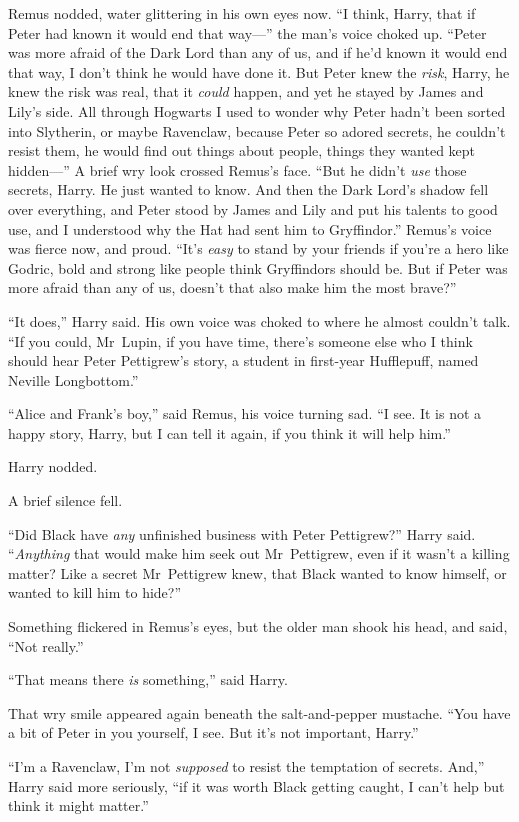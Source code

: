 Remus nodded, water glittering in his own eyes now. “I think, Harry, that if
Peter had known it would end that way—” the man’s voice choked up. “Peter was
more afraid of the Dark Lord than any of us, and if he’d known it would end
that way, I don’t think he would have done it. But Peter knew the \emph{risk},
Harry, he knew the risk was real, that it \emph{could} happen, and yet he
stayed by James and Lily’s side. All through Hogwarts I used to wonder why
Peter hadn’t been sorted into Slytherin, or maybe Ravenclaw, because Peter so
adored secrets, he couldn’t resist them, he would find out things about people,
things they wanted kept hidden—” A brief wry look crossed Remus’s face. “But
he didn’t \emph{use} those secrets, Harry. He just wanted to know. And then the
Dark Lord’s shadow fell over everything, and Peter stood by James and Lily and
put his talents to good use, and I understood why the Hat had sent him to
Gryffindor.” Remus’s voice was fierce now, and proud. “It’s \emph{easy} to
stand by your friends if you’re a hero like Godric, bold and strong like people
think Gryffindors should be. But if Peter was more afraid than any of us,
doesn’t that also make him the most brave?”

“It does,” Harry said. His own voice was choked to where he almost couldn’t
talk. “If you could, Mr~Lupin, if you have time, there’s someone else who I
think should hear Peter Pettigrew’s story, a student in first-year Hufflepuff,
named Neville Longbottom.”

“Alice and Frank’s boy,” said Remus, his voice turning sad. “I see. It is not a
happy story, Harry, but I can tell it again, if you think it will help him.”

Harry nodded.

A brief silence fell.

“Did Black have \emph{any} unfinished business with Peter Pettigrew?” Harry
said. “\emph{Anything} that would make him seek out Mr~Pettigrew, even if it
wasn’t a killing matter? Like a secret Mr~Pettigrew knew, that Black wanted to
know himself, or wanted to kill him to hide?”

Something flickered in Remus’s eyes, but the older man shook his head, and
said, “Not really.”

“That means there \emph{is} something,” said Harry.

That wry smile appeared again beneath the salt-and-pepper mustache. “You have a
bit of Peter in you yourself, I see. But it’s not important, Harry.”

“I’m a Ravenclaw, I’m not \emph{supposed} to resist the temptation of secrets.
And,” Harry said more seriously, “if it was worth Black getting caught, I can’t
help but think it might matter.”

